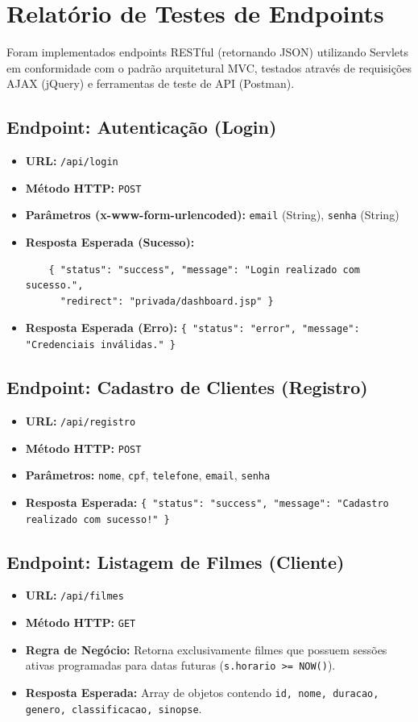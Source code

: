 \section{Relatório de Testes de Endpoints}

Foram implementados endpoints RESTful (retornando JSON) utilizando Servlets em conformidade com o padrão arquitetural MVC, testados através de requisições AJAX (jQuery) e ferramentas de teste de API (Postman).

\subsection{Endpoint: Autenticação (Login)}
\begin{itemize}
    \item \textbf{URL:} \texttt{/api/login}
    \item \textbf{Método HTTP:} \texttt{POST}
    \item \textbf{Parâmetros (x-www-form-urlencoded):} \texttt{email} (String), \texttt{senha} (String)
    \item \textbf{Resposta Esperada (Sucesso):}
    \begin{verbatim}
    { "status": "success", "message": "Login realizado com sucesso.", 
      "redirect": "privada/dashboard.jsp" }
    \end{verbatim}
    \item \textbf{Resposta Esperada (Erro):} \texttt{\{ "status": "error", "message": "Credenciais inválidas." \}}
\end{itemize}

\subsection{Endpoint: Cadastro de Clientes (Registro)}
\begin{itemize}
    \item \textbf{URL:} \texttt{/api/registro}
    \item \textbf{Método HTTP:} \texttt{POST}
    \item \textbf{Parâmetros:} \texttt{nome}, \texttt{cpf}, \texttt{telefone}, \texttt{email}, \texttt{senha}
    \item \textbf{Resposta Esperada:} \texttt{\{ "status": "success", "message": "Cadastro realizado com sucesso!" \}}
\end{itemize}

\subsection{Endpoint: Listagem de Filmes (Cliente)}
\begin{itemize}
    \item \textbf{URL:} \texttt{/api/filmes}
    \item \textbf{Método HTTP:} \texttt{GET}
    \item \textbf{Regra de Negócio:} Retorna exclusivamente filmes que possuem sessões ativas programadas para datas futuras (\texttt{s.horario >= NOW()}).
    \item \textbf{Resposta Esperada:} Array de objetos contendo \texttt{id, nome, duracao, genero, classificacao, sinopse}.
\end{itemize}

